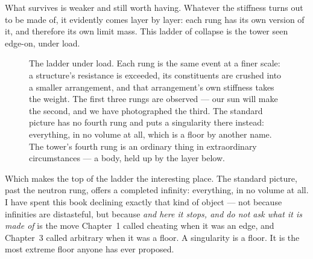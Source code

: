 \documentclass[fontsize=11pt,paper=a4,pagesize=auto,parskip=half-]{scrbook}
\begin{document}
What survives is weaker and still worth having. Whatever the stiffness turns out to be made of, it evidently comes layer by layer: each rung has its own version of it, and therefore its own limit mass. This ladder of collapse is the tower seen edge-on, under load.

\begin{figure}[htbp]
\centering
{}
\caption{The ladder under load. Each rung is the same event at a finer scale: a structure's resistance is exceeded, its constituents are crushed into a smaller arrangement, and that arrangement's own stiffness takes the weight. The first three rungs are observed --- our sun will make the second, and we have photographed the third. The standard picture has no fourth rung and puts a singularity there instead: everything, in no volume at all, which is a floor by another name. The tower's fourth rung is an ordinary thing in extraordinary circumstances --- a body, held up by the layer below.}
\label{fig:collapseladder}
\end{figure}

Which makes the top of the ladder the interesting place. The standard picture, past the neutron rung, offers a completed infinity: everything, in no volume at all. I have spent this book declining exactly that kind of object --- not because infinities are distasteful, but because \emph{and here it stops, and do not ask what it is made of} is the move Chapter~1 called cheating when it was an edge, and Chapter~3 called arbitrary when it was a floor. A singularity is a floor. It is the most extreme floor anyone has ever proposed.
\end{document}
